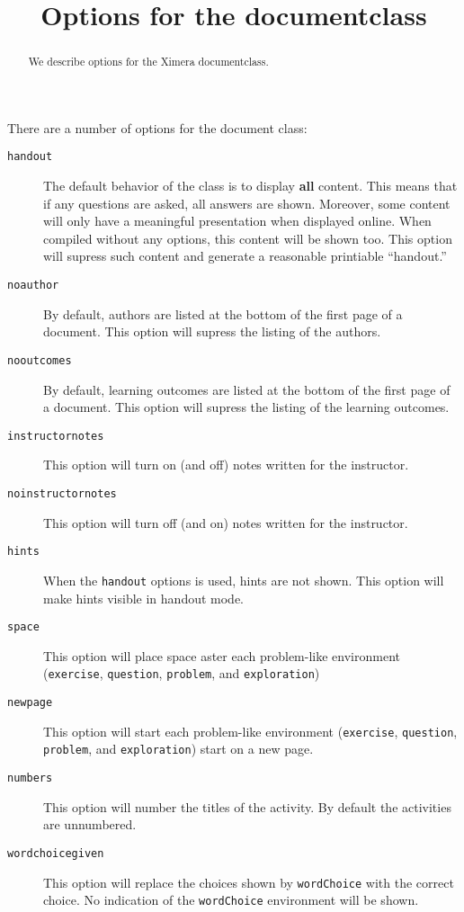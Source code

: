 \documentclass{ximera}
\title{Options for the documentclass}
\begin{document}
\begin{abstract}
  We describe options for the Ximera documentclass. 
\end{abstract}
\maketitle

There are a number of options for the document class:

\begin{description}
\item[\texttt{handout}] The default behavior of the class is to display \textbf{all} content. This means that if any questions are asked, all answers are shown. Moreover, some content will only have a meaningful presentation when displayed online. When compiled without any options, this content will be shown too. This option will supress such content and generate a reasonable printiable ``handout.''
\item[\texttt{noauthor}] By default, authors are listed at the bottom of the first page of a document. This option will supress the listing of the authors.
\item[\texttt{nooutcomes}] By default, learning outcomes are listed at the bottom of the first page of a document. This option will supress the listing of the learning outcomes.
\item[\texttt{instructornotes}] This option will turn on (and off) notes written for the instructor.
\item[\texttt{noinstructornotes}] This option will turn off (and on) notes written for the instructor.
\item[\texttt{hints}] When the \texttt{handout} options is used, hints are not shown. This option will make hints visible in handout mode.
\item[\texttt{space}] This option will place space aster each problem-like environment (\texttt{exercise}, \texttt{question}, \texttt{problem}, and \texttt{exploration})
\item[\texttt{newpage}] This option will start each problem-like environment (\texttt{exercise}, \texttt{question}, \texttt{problem}, and \texttt{exploration}) start on a new page.
\item[\texttt{numbers}] This option will number the titles of the activity. By default the activities are unnumbered.
\item[\texttt{wordchoicegiven}] This option will replace the choices shown by \texttt{wordChoice} with the correct choice. No indication of the \texttt{wordChoice} environment will be shown.
\end{description}
\end{document}
